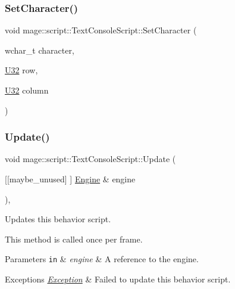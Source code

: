 \subsubsection{\texorpdfstring{Set\+Character()}{SetCharacter()}}
{\footnotesize\ttfamily void mage\+::script\+::\+Text\+Console\+Script\+::\+Set\+Character (\begin{DoxyParamCaption}\item[{wchar\+\_\+t}]{character,  }\item[{\mbox{\hyperlink{namespacemage_a41c104c036fba3756a74e19f793eeaa1}{U32}}}]{row,  }\item[{\mbox{\hyperlink{namespacemage_a41c104c036fba3756a74e19f793eeaa1}{U32}}}]{column }\end{DoxyParamCaption})\hspace{0.3cm}{\ttfamily [private]}}

\mbox{\label{classmage_1_1script_1_1_text_console_script_ad619f93a946660b30f5e39821778f7b0}} 
\subsubsection{\texorpdfstring{Update()}{Update()}}
{\footnotesize\ttfamily void mage\+::script\+::\+Text\+Console\+Script\+::\+Update (\begin{DoxyParamCaption}\item[{\mbox{[}\mbox{[}maybe\+\_\+unused\mbox{]} \mbox{]} \mbox{\hyperlink{classmage_1_1_engine}{Engine}} \&}]{engine }\end{DoxyParamCaption})\hspace{0.3cm}{\ttfamily [override]}, {\ttfamily [virtual]}}

Updates this behavior script.

This method is called once per frame.


\begin{DoxyParams}[1]{Parameters}
\mbox{\tt in}  & {\em engine} & A reference to the engine. \\
\hline
\end{DoxyParams}

\begin{DoxyExceptions}{Exceptions}
{\em \mbox{\hyperlink{classmage_1_1_exception}{Exception}}} & Failed to update this behavior script. \\
\hline
\end{DoxyExceptions}


